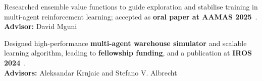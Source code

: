 \documentclass[a4paper,12pt]{article}
\begin{document}
\begin{expblock}
    Researched ensemble value functions to guide exploration and stabilise training in multi-agent reinforcement learning; accepted as \textbf{oral paper at AAMAS 2025}~\cite{schaefer2025emax}.\\
    \textbf{Advisor:} David Mguni
\end{expblock}

\begin{expblock}
    Designed high-performance \textbf{multi-agent warehouse simulator} and scalable learning algorithm, leading to \textbf{fellowship funding}, and a publication at \textbf{IROS 2024}~\cite{krnjaic2024scalable}.\\
    \textbf{Advisors:} Aleksandar Krnjaic and Stefano V. Albrecht
\end{expblock}

\end{document}
